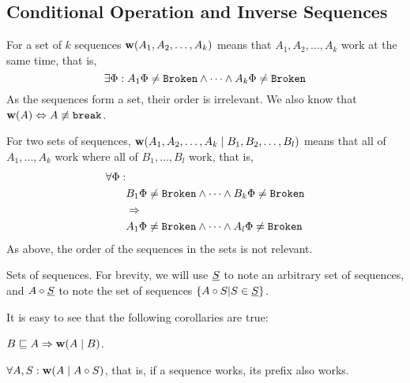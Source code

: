 

\subsection{Conditional Operation and Inverse Sequences}

\begin{mydef}
For a set of $k$ sequences
$\mathbf{w}({A_1,A_2,\ldots,A_k})$ means that 
$A_1,A_2,\ldots,A_k$ work at the same time, that is,
\[\exists \Phi: A_1\Phi\neq\mathtt{Broken} \wedge \cdots \wedge A_k\Phi\neq\mathtt{Broken}\]
As the sequences form a set, their order is irrelevant.
We also know that $\mathbf{w}({A}) \Leftrightarrow A\not\equiv \mathtt{break}$. 
\end{mydef}

\begin{mydef}
For two sets of sequences, $\mathbf{w}({A_1,A_2,\ldots,A_k}\mathrel{|}{B_1,B_2,\ldots,B_l})$ means that 
all of $A_1,\ldots,A_k$ work where all of $B_1,\ldots,B_l$ work,
that is,
\begin{align*}
\forall \Phi:&\\ 
&B_1\Phi\neq\mathtt{Broken} \wedge \cdots \wedge B_k\Phi\neq\mathtt{Broken}\\
&\Rightarrow\\
&A_1\Phi\neq\mathtt{Broken} \wedge \cdots \wedge A_l\Phi\neq\mathtt{Broken}
\end{align*}
As above, the order of the sequences in the sets is not relevant.
\end{mydef}

\begin{mydef}{Sets of sequences.}
For brevity, we will use $\underline{S}$ to note an arbitrary set of sequences,
and $A\circ\underline{S}$ to note the set of sequences $\{A\circ S|S\in\underline{S}\}$.
\end{mydef}

It is easy to see that the following corollaries are true:


\begin{mycor}
$B\sqsubseteq A \Rightarrow \mathbf{w}({A}\mathrel{|}{B})$.
\end{mycor}

\begin{mycor}\label{worksextpostfix}
$\forall A,S: \mathbf{w}({A}\mathrel{|}{A\circ S})$, that is, if a sequence works, its prefix also works.
\end{mycor}

